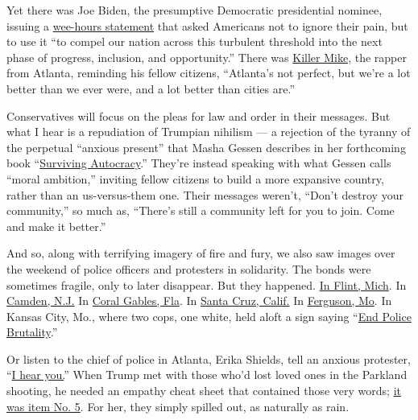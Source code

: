 Yet there was Joe Biden, the presumptive Democratic presidential
nominee, issuing a
\href{https://deadline.com/2020/05/george-floyd-protests-joe-biden-statement-violence-curfews-donald-trump-silent-1202947533/}{wee-hours
statement} that asked Americans not to ignore their pain, but to use it
``to compel our nation across this turbulent threshold into the next
phase of progress, inclusion, and opportunity.'' There was
\href{https://www.youtube.com/watch?v=rapfJYfPU38}{Killer Mike}, the
rapper from Atlanta, reminding his fellow citizens, ``Atlanta's not
perfect, but we're a lot better than we ever were, and a lot better than
cities are.''

Conservatives will focus on the pleas for law and order in their
messages. But what I hear is a repudiation of Trumpian nihilism --- a
rejection of the tyranny of the perpetual ``anxious present'' that Masha
Gessen describes in her forthcoming book
``\href{https://www.washingtonpost.com/outlook/2020/05/28/how-fight-back-against-trumpism-with-moral-aspiration/}{Surviving
Autocracy}.'' They're instead speaking with what Gessen calls ``moral
ambition,'' inviting fellow citizens to build a more expansive country,
rather than an us-versus-them one. Their messages weren't, ``Don't
destroy your community,'' so much as, ``There's still a community left
for you to join. Come and make it better.''

And so, along with terrifying imagery of fire and fury, we also saw
images over the weekend of police officers and protesters in solidarity.
The bonds were sometimes fragile, only to later disappear. But they
happened.
\href{https://twitter.com/Goodable/status/1266933266545881088}{In Flint,
Mich}. In
\href{https://abcnews.go.com/US/wireStory/police-praised-joining-front-line-floyd-protests-70983707}{Camden,
N.J.} In
\href{https://cbs12.com/news/local/police-take-a-knee-in-solidarity-prayer-with-protesters-in-coral-gables}{Coral
Gables, Fla}. In
\href{https://twitter.com/hknightsf/status/1266850494527365120}{Santa
Cruz, Calif.} In
\href{https://www.forbes.com/sites/lisettevoytko/2020/05/31/in-some-cities-police-officers-joined-protesters-marching-against-brutality/\#76c983145edb}{Ferguson,
Mo}. In Kansas City, Mo., where two cops, one white, held aloft a sign
saying
``\href{https://twitter.com/JasonKander/status/1266735093500051457/photo/1}{End
Police Brutality}.''

Or listen to the chief of police in Atlanta, Erika Shields, tell an
anxious protester,
``\href{https://twitter.com/search?q=chief\%20of\%20police\%20atlanta\%20\&src=typed_query}{I
hear you.}'' When Trump met with those who'd lost loved ones in the
Parkland shooting, he needed an empathy cheat sheet that contained those
very words;
\href{https://www.nytimes.com/2018/02/22/us/politics/trump-talking-points.html}{it
was item No. 5}. For her, they simply spilled out, as naturally as rain.

